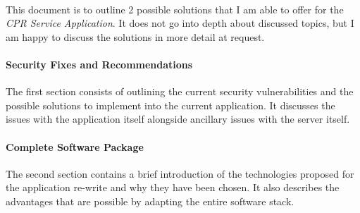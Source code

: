 \paragraph{}
This document is to outline 2 possible solutions that I am able to offer for the \emph{CPR Service Application}.
It does not go into depth about discussed topics, but I am happy to discuss the solutions in more detail at request.

\paragraph{Security Fixes and Recommendations}
The first section consists of outlining the current security vulnerabilities and the possible solutions to implement into the current application.
It discusses the issues with the application itself alongside ancillary issues with the server itself.

\paragraph{Complete Software Package}
The second section contains a brief introduction of the technologies proposed for the application re-write and why they have been chosen.
It also describes the advantages that are possible by adapting the entire software stack.